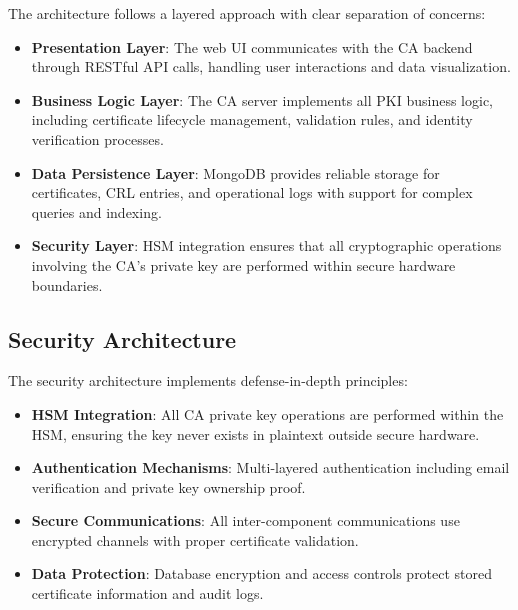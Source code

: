 The architecture follows a layered approach with clear separation of concerns:

\begin{itemize}
    \item \textbf{Presentation Layer}: The web UI communicates with the CA backend through RESTful API calls, handling user interactions and data visualization.
    
    \item \textbf{Business Logic Layer}: The CA server implements all PKI business logic, including certificate lifecycle management, validation rules, and identity verification processes.
    
    \item \textbf{Data Persistence Layer}: MongoDB provides reliable storage for certificates, CRL entries, and operational logs with support for complex queries and indexing.
    
    \item \textbf{Security Layer}: HSM integration ensures that all cryptographic operations involving the CA's private key are performed within secure hardware boundaries.
\end{itemize}

\subsection{Security Architecture}

The security architecture implements defense-in-depth principles:

\begin{itemize}
    \item \textbf{HSM Integration}: All CA private key operations are performed within the HSM, ensuring the key never exists in plaintext outside secure hardware.
    
    \item \textbf{Authentication Mechanisms}: Multi-layered authentication including email verification and private key ownership proof.
    
    \item \textbf{Secure Communications}: All inter-component communications use encrypted channels with proper certificate validation.
    
    \item \textbf{Data Protection}: Database encryption and access controls protect stored certificate information and audit logs.
\end{itemize}

